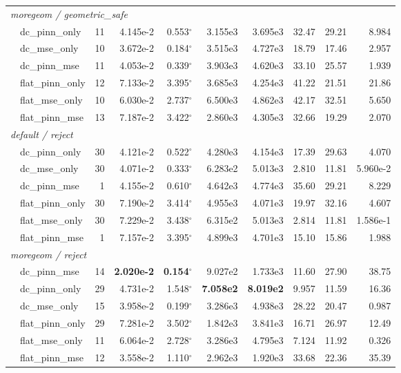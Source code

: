 \documentclass{article}
\begin{document}
\begin{table}[h]
\begin{tabular}{llrrrrrrrr}
\midrule
\multicolumn{10}{l}{\textit{moregeom / geometric\_safe}} \\
& dc\_pinn\_only  & 11 & 4.145e-2 & 0.553\ensuremath{^\circ} & 3.155e3 & 3.695e3 & 32.47 & 29.21 & 8.984 \\
& dc\_mse\_only   & 10 & 3.672e-2 & 0.184\ensuremath{^\circ} & 3.515e3 & 4.727e3 & 18.79 & 17.46 & 2.957 \\
& dc\_pinn\_mse   & 11 & 4.053e-2 & 0.339\ensuremath{^\circ} & 3.903e3 & 4.620e3 & 33.10 & 25.57 & 1.939 \\
& flat\_pinn\_only& 12 & 7.133e-2 & 3.395\ensuremath{^\circ} & 3.685e3 & 4.254e3 & 41.22 & 21.51 & 21.86 \\
& flat\_mse\_only & 10 & 6.030e-2 & 2.737\ensuremath{^\circ} & 6.500e3 & 4.862e3 & 42.17 & 32.51 & 5.650 \\
& flat\_pinn\_mse & 13 & 7.187e-2 & 3.422\ensuremath{^\circ} & 2.860e3 & 4.305e3 & 32.66 & 19.29 & 2.070 \\
\midrule
\multicolumn{10}{l}{\textit{default / reject}} \\
& dc\_pinn\_only  & 30 & 4.121e-2 & 0.522\ensuremath{^\circ} & 4.280e3 & 4.154e3 & 17.39 & 29.63 & 4.070 \\
& dc\_mse\_only   & 30 & 4.071e-2 & 0.333\ensuremath{^\circ} & 6.283e2 & 5.013e3 & 2.810 & 11.81 & 5.960e-2 \\
& dc\_pinn\_mse   &  1 & 4.155e-2 & 0.610\ensuremath{^\circ} & 4.642e3 & 4.774e3 & 35.60 & 29.21 & 8.229 \\
& flat\_pinn\_only& 30 & 7.190e-2 & 3.414\ensuremath{^\circ} & 4.955e3 & 4.071e3 & 19.97 & 32.16 & 4.607 \\
& flat\_mse\_only & 30 & 7.229e-2 & 3.438\ensuremath{^\circ} & 6.315e2 & 5.013e3 & 2.814 & 11.81 & 1.586e-1 \\
& flat\_pinn\_mse &  1 & 7.157e-2 & 3.395\ensuremath{^\circ} & 4.899e3 & 4.701e3 & 15.10 & 15.86 & 1.988 \\
\midrule
\multicolumn{10}{l}{\textit{moregeom / reject}} \\
\rowcolor{bestgreen}
& dc\_pinn\_mse   & 14 & \textbf{2.020e-2} & \textbf{0.154\ensuremath{^\circ}} & 9.027e2 & 1.733e3 & 11.60 & 27.90 & 38.75 \\
\rowcolor{neutralblue}
& dc\_pinn\_only  & 29 & 4.731e-2 & 1.548\ensuremath{^\circ} & \textbf{7.058e2} & \textbf{8.019e2} & 9.957 & 11.59 & 16.36 \\
& dc\_mse\_only   & 15 & 3.958e-2 & 0.199\ensuremath{^\circ} & 3.286e3 & 4.938e3 & 28.22 & 20.47 & 0.987 \\
& flat\_pinn\_only& 29 & 7.281e-2 & 3.502\ensuremath{^\circ} & 1.842e3 & 3.841e3 & 16.71 & 26.97 & 12.49 \\
& flat\_mse\_only & 11 & 6.064e-2 & 2.728\ensuremath{^\circ} & 3.286e3 & 4.795e3 & 7.124 & 11.92 & 0.326 \\
& flat\_pinn\_mse & 12 & 3.558e-2 & 1.110\ensuremath{^\circ} & 2.962e3 & 1.920e3 & 33.68 & 22.36 & 35.39 \\
\bottomrule
\end{tabular}
\end{table}
\end{document}
